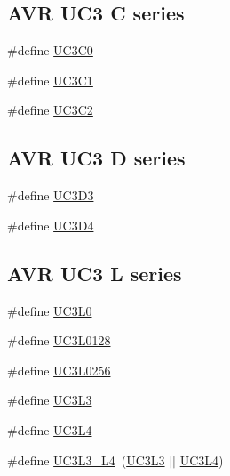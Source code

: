 \subsection*{A\+VR U\+C3 C series}
\begin{DoxyCompactItemize}
\item 
\#define \mbox{\hyperlink{group__uc3__part__macros__group_ga4519bacce7868e73227b94af6e2a1b7f}{U\+C3\+C0}}
\item 
\#define \mbox{\hyperlink{group__uc3__part__macros__group_ga775cb0ff401f59a6062a4513ce6a65e6}{U\+C3\+C1}}
\item 
\#define \mbox{\hyperlink{group__uc3__part__macros__group_ga74bddd178c8022709acca0ad80ff4db8}{U\+C3\+C2}}
\end{DoxyCompactItemize}
\subsection*{A\+VR U\+C3 D series}
\begin{DoxyCompactItemize}
\item 
\#define \mbox{\hyperlink{group__uc3__part__macros__group_ga432af70c4d53fc917770e4ce48440613}{U\+C3\+D3}}
\item 
\#define \mbox{\hyperlink{group__uc3__part__macros__group_gae271cf5f4b9459baea7216c071e02d76}{U\+C3\+D4}}
\end{DoxyCompactItemize}
\subsection*{A\+VR U\+C3 L series}
\begin{DoxyCompactItemize}
\item 
\#define \mbox{\hyperlink{group__uc3__part__macros__group_ga4a399e061cd2bf1088c01a22f69cf6c1}{U\+C3\+L0}}
\item 
\#define \mbox{\hyperlink{group__uc3__part__macros__group_ga2acf2e6f59e322e343123ad12fe89c2c}{U\+C3\+L0128}}
\item 
\#define \mbox{\hyperlink{group__uc3__part__macros__group_gaa8ab88d4e48e7936416c4475b42e5b49}{U\+C3\+L0256}}
\item 
\#define \mbox{\hyperlink{group__uc3__part__macros__group_gade3b8d2d26305ef47bb7b52212807e1d}{U\+C3\+L3}}
\item 
\#define \mbox{\hyperlink{group__uc3__part__macros__group_gae119ee2bcbfe63aa6cb0bc92245943f6}{U\+C3\+L4}}
\item 
\#define \mbox{\hyperlink{group__uc3__part__macros__group_gae4dccd708991a86a5e8598b0c72d6bbd}{U\+C3\+L3\+\_\+\+L4}}~(\mbox{\hyperlink{group__uc3__part__macros__group_gade3b8d2d26305ef47bb7b52212807e1d}{U\+C3\+L3}} $\vert$$\vert$ \mbox{\hyperlink{group__uc3__part__macros__group_gae119ee2bcbfe63aa6cb0bc92245943f6}{U\+C3\+L4}})
\end{DoxyCompactItemize}
